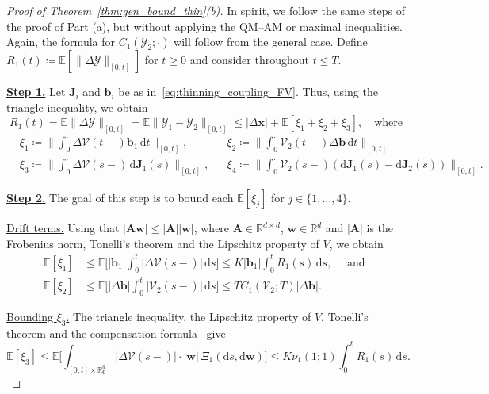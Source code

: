 \documentclass[en,oneside,bbfont,article]{amsart}
\theoremstyle{remark}
\theoremstyle{definition}
\theoremstyle{definition}
\newcommand\Y{\bm{\mathcal{Y}}}
\newcommand{\V}{\bm{\mathcal{V}}}
\newcommand\R{\mathbb{R}}
\newcommand\E{\mathds{E}}
\newcommand\1{\mathds{1}}
\renewcommand\le{\leqslant}
\renewcommand\ge{\geqslant}
\newcommand{\D}{\mathrm{d}}
\begin{document}
\begin{proof}[Proof of Theorem~\ref{thm:gen_bound_thin}(b)]
In spirit, we follow the same steps of the proof of Part (a), but without applying the QM--AM or maximal inequalities. Again, the formula for $C_1(\Y_2;\cdot)$ will follow from the general case. Define $R_1(t)\coloneqq \E[\|\Delta\Y\|_{[0,t]}]$ for $t\ge 0$ and consider throughout $t\le T$. 

\underline{\textbf{Step 1.}} 
Let $\bm{J}_i$ and $\bm{b}_i$ be as in~\eqref{eq:thinning_coupling_FV}. Thus, using the triangle inequality, we obtain
\begin{equation}
R_1(t)=\E\|\Delta\Y\|_{[0,t]}=\E\|\Y_1-\Y_2\|_{[0,t]}
\le |\Delta\bm{x}|+\E[\xi_1+\xi_2+\xi_3],
\quad\text{where}\label{eq:R(T)_gen_bound-FV}
\end{equation}
\vspace{-6mm}
\begin{align*}
&\xi_1\coloneqq
\bigg\|\int_0^\cdot \Delta\V(t-)\bm{b}_1\,\D t\bigg\|_{[0,t]},  
&&\xi_2\coloneqq
\bigg\|\int_0^\cdot \V_2(t-)\Delta\bm{b}\,\D t\bigg\|_{[0,t]}\\
&\xi_3 \coloneqq \bigg\|\int_0^\cdot \Delta\V(s-)\,\D\bm{J}_1(s)\bigg\|_{[0,t]},
&&\xi_4\coloneqq \bigg\|\int_0^\cdot \V_2(s-)(\D\bm{J}_1(s)-\D\bm{J}_2(s))\bigg\|_{[0,t]}.
\end{align*} 

\underline{\textbf{Step 2.}}
The goal of this step is to bound each $\E[\xi_j]$ for $j\in\{1,\ldots,4\}$. 

{\underline{Drift terms.}} Using that $|\bm{A} \bm{w}| \le |\bm{A}||\bm{w}|$, where $\bm{A} \in \R^{d \times d}$, $\bm{w} \in \R^d$ and $|\bm{A}|$ is the Frobenius norm, Tonelli's theorem and the Lipschitz property of $V$, we obtain
\begin{align}
\label{eq:xi1-FV}
\E[\xi_{1}]
&\le \E\bigg[|\bm{b}_1|\int_0^t|\Delta\V(s-)|\,\D s \bigg] 
\le K|\bm{b}_1|\int_0^t R_1(s)\,\D s, \quad \text{ and }\\
\label{eq:xi2-FV}
\E[\xi_{2}]
&\le \E\bigg[|\Delta\bm{b}|\int_0^t|\V_2(s-)|\,\D s \bigg] 
\le T C_1(\V_2;T)|\Delta\bm{b}|.
\end{align} 

{\underline{Bounding $\xi_3$.}} 
The triangle inequality, the Lipschitz property of $V$, Tonelli's theorem and the compensation formula~\cite[Thm~10.21]{MR4226142} give
\begin{equation}
\label{eq:xi_3-middle-step-FV}
\E[\xi_3] 
\le\E\bigg[\int_{[0,t]\times\R^d_{\bm0}}|\Delta\V(s-)| \!\cdot\! |\bm{w}|\,\Xi_1(\D s,\D\bm{w})\bigg]
\le K\nu_1(1;1)\int_0^t R_1(s) \,\D s.
\end{equation} 


\end{proof}
\end{document}
